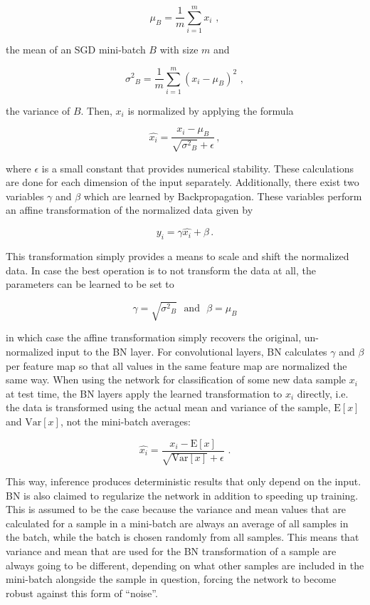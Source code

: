 \[ \mu_B = \frac{1}{m} \sum \limits_{i=1}^{m} x_i\,\,, \]

\noindent the mean of an SGD mini-batch $B$ with size $m$ and

\[ {\sigma^2}_B = \frac{1}{m} \sum \limits_{i=1}^{m} \left ( x_i - \mu_B \right )^2 \,\,, \]

\noindent the variance of $B$. Then, $x_i$ is normalized by applying the formula

\[  \hat{x_i} = \frac{x_i - \mu_B}{\sqrt{{\sigma^2}_B} + \epsilon} \,, \]

\noindent where $\epsilon$ is a small constant that provides numerical stability. These calculations are done for each dimension of the input separately. Additionally, there exist two variables $\gamma$ and $\beta$ which are learned by Backpropagation. These variables perform an affine transformation of the normalized data given by

\[ y_i = \gamma \hat{x_i} + \beta \,. \]

\noindent This transformation simply provides a means to scale and shift the normalized data. In case the best operation is to not transform the data at all, the parameters can be learned to be set to 

\[ \gamma = \sqrt{{\sigma^2}_B} \,\,\text{ and } \,\, \beta = \mu_B \]

\noindent in which case the affine transformation simply recovers the original, un\--norm\-a\-lized input to the BN layer. For convolutional layers, BN calculates $\gamma$ and $\beta$ per feature map so that all values in the same feature map are normalized the same way. When using the network for classification of some new data sample $x_i$ at test time, the BN layers apply the learned transformation to $x_i$ directly, i.e. the data is transformed using the actual mean and variance of the sample, $\text{E}[x]$ and $\text{Var}[x]$, not the mini-batch averages:

\[  \hat{x_i} = \frac{x_i - \text{E}[x]}{\sqrt{\text{Var}[x]} + \epsilon}\,\,  . \]

\noindent This way, inference produces deterministic results that only depend on the input.\\

\noindent BN is also claimed to regularize the network in addition to speeding up training. This is assumed to be the case because the variance and mean values that are calculated for a sample in a mini-batch are always an average of all samples in the batch, while the batch is chosen randomly from all samples. This means that variance and mean that are used for the BN transformation of a sample are always going to be different, depending on what other samples are included in the mini-batch alongside the sample in question, forcing the network to become robust against this form of ``noise''.


